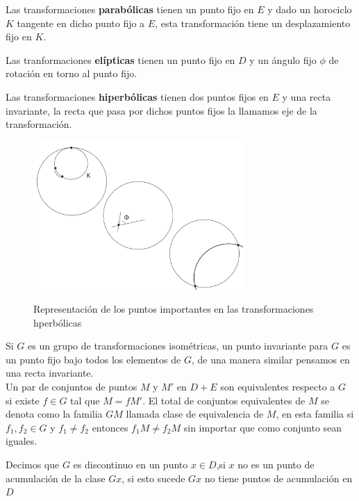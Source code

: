 \begin{defn}
Las transformaciones \textbf{parab\'olicas} tienen un punto fijo en
$E$ y dado un horociclo $K$ tangente en dicho punto fijo a $E$, esta
transformaci\'on tiene un desplazamiento fijo en $K$.


Las tranformaciones \textbf{el\'ipticas} tienen un punto fijo en $D$
y un \'angulo fijo $\phi$ de rotaci\'on en torno al punto fijo.


Las transformaciones \textbf{hiperb\'olicas} tienen dos puntos fijos
en $E$ y una recta invariante, la recta que pasa por dichos puntos
fijos la llamamos eje de la transformaci\'on.


\begin{figure}[h]
  \centering
  \includegraphics[width=8cm]{definicion40.pdf}\\
  \caption{Representaci\'on de los puntos importantes en las transformaciones hperb\'olicas}\label{definicion40}
\end{figure}


\end{defn}

Si $G$ es un grupo de transformaciones isom\'etricas, un punto
invariante para $G$ es un punto fijo bajo todos los elementos de $G$, de
una manera similar pensamos en una recta invariante. \\

Un par de conjuntos de puntos $M$ y $M'$ en $D + E$ son equivalentes respecto a
$G$ si existe $f \in G$ tal que $M = fM'$. El total de conjuntos
equivalentes de $M$ se denota como la familia $GM$ llamada clase de
equivalencia de $M$, en esta familia si $f_{1},f_{2} \in G  $ y
$f_{1} \neq f_{2 }$ entonces $f_{1}M \neq f_{2}M$ sin importar que
como conjunto sean iguales. \\

\begin{defn}
Decimos que $G$ es discontinuo en un punto $x \in D$,si $x$ no es un
punto de acumulaci\'on de la clase $Gx$, si esto sucede $Gx$ no
tiene puntos de acumulaci\'on en $D$
\end{defn}


